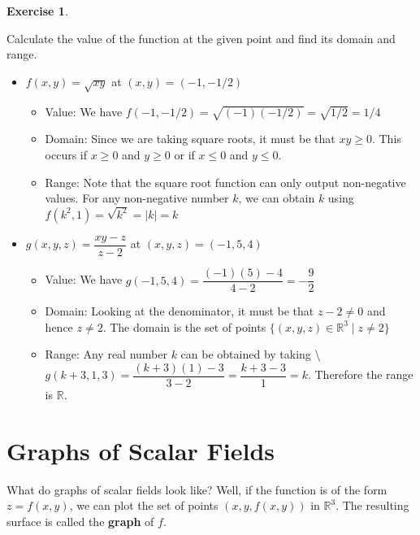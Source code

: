 \documentclass[
]{book}
\providecommand{\tightlist}{%
  \setlength{\itemsep}{0pt}\setlength{\parskip}{0pt}}
\theoremstyle{definition}
\theoremstyle{definition}
\theoremstyle{definition}
\newtheorem{exercise}{Exercise}[chapter]
\theoremstyle{definition}
\theoremstyle{remark}
\begin{document}
\begin{exercise}
\protect\hypertarget{exr:unlabeled-div-2}{}\label{exr:unlabeled-div-2}

Calculate the value of the function at the given point and find its domain and range.

\begin{itemize}
\tightlist
\item
  \(f(x,y)=\sqrt{xy}\) at \((x,y)=(-1, -1/2)\)

  \begin{itemize}
  \tightlist
  \item
    Value: We have \(f(-1, -1/2)=\sqrt{(-1)(-1/2)}=\sqrt{1/2}=1/4\)
  \item
    Domain: Since we are taking square roots, it must be that \(xy \geq 0\). This occurs if \(x\geq 0\) and \(y\geq 0\) or if \(x\leq0\) and \(y\leq 0\).
  \item
    Range: Note that the square root function can only output non-negative values. For any non-negative number \(k\), we can obtain \(k\) using \(f(k^2,1) = \sqrt{k^2}=|k|=k\)
  \end{itemize}
\item
  \(g(x,y,z)= \dfrac{xy-z}{z-2}\) at \((x,y,z)=(-1,5,4)\)

  \begin{itemize}
  \tightlist
  \item
    Value: We have \(g(-1,5,4)=\dfrac{(-1)(5)-4}{4-2}=-\dfrac{9}{2}\)
  \item
    Domain: Looking at the denominator, it must be that \(z-2 \neq 0\) and hence \(z \neq 2\). The domain is the set of points \(\{(x,y,z)\in\mathbb{R}^3\mid z\neq 2\}\)
  \item
    Range: Any real number \(k\) can be obtained by taking \textbackslash{} \(g(k+3, 1, 3) = \dfrac{(k+3)(1)-3}{3-2}=\dfrac{k+3-3}{1}=k\). Therefore the range is \(\mathbb{R}.\)
  \end{itemize}
\end{itemize}

\end{exercise}

\hypertarget{graphs-of-scalar-fields}{%
\section{Graphs of Scalar Fields}\label{graphs-of-scalar-fields}}

What do graphs of scalar fields look like? Well, if the function is of the form \(z=f(x,y)\), we can plot the set of points \((x,y, f(x,y))\) in \(\mathbb{R}^3\). The resulting surface is called the \textbf{graph} of \(f\).
\end{document}
